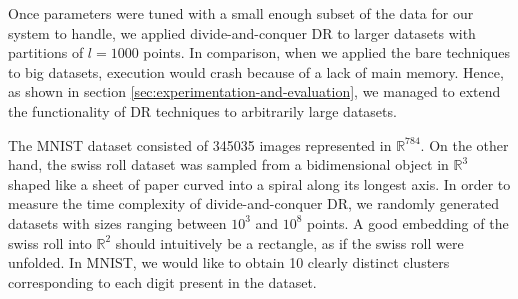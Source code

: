 Once parameters were tuned with a small enough subset of the data for our system to handle, we applied divide-and-conquer DR to larger datasets with partitions of $l=1000$ points. In comparison, when we applied the bare techniques to big datasets, execution would crash because of a lack of main memory. Hence, as shown in section \ref{sec:experimentation-and-evaluation}, we managed to extend the functionality of DR techniques to arbitrarily large datasets.

The MNIST dataset consisted of 345035 images represented in $\mathbb{R}^{784}$. On the other hand, the swiss roll dataset was sampled from a bidimensional object in $\mathbb{R}^3$ shaped like a sheet of paper curved into a spiral along its longest axis. In order to measure the time complexity of divide-and-conquer DR, we randomly generated datasets with sizes ranging between $10^3$ and $10^8$ points. A good embedding of the swiss roll into $\mathbb{R}^2$ should intuitively be a rectangle, as if the swiss roll were unfolded. In MNIST, we would like to obtain 10 clearly distinct clusters corresponding to each digit present in the dataset.